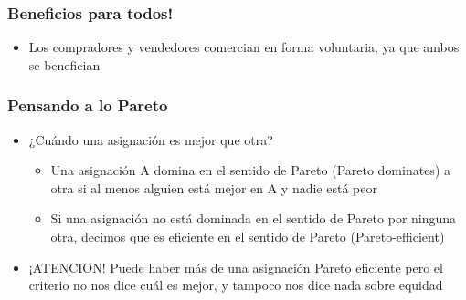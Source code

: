 \documentclass{beamer}
\begin{document}



\begin{frame}
\frametitle{Beneficios para todos!}
\begin{itemize}
    \item Los compradores y vendedores comercian en forma voluntaria, ya que ambos se benefician
\end{itemize}
\centering
\end{frame}

\begin{frame}
\frametitle{Pensando a lo Pareto}
\begin{itemize}
    \item ¿Cuándo una asignación es mejor que otra?
    \begin{itemize}
        \item Una asignación A domina en el sentido de Pareto (Pareto dominates) a otra si al menos alguien está mejor en A y nadie está peor
        \item Si una asignación no está dominada en el sentido de Pareto por ninguna otra, decimos que es eficiente en el sentido de Pareto (Pareto-efficient)
    \end{itemize}
    \item ¡ATENCION! Puede haber más de una asignación Pareto eficiente pero el criterio no nos dice cuál es mejor, y tampoco nos dice nada sobre equidad 
\end{itemize}
\end{frame}
\end{document}
